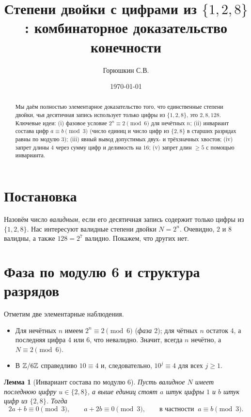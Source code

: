 \documentclass[12pt]{article}
\title{Степени двойки с цифрами из $\{1,2,8\}$: комбинаторное доказательство конечности}
\author{Горюшкин С.В.}
\date{\today}
\theoremstyle{plain}
\newtheorem{lemma}{Лемма}
\theoremstyle{remark}
\begin{document}
\maketitle

\begin{abstract}
Мы даём полностью элементарное доказательство того, что единственные степени двойки, чья десятичная запись использует только цифры из $\{1,2,8\}$, это $2,8,128$. Ключевые идеи: (i) фазовое условие $2^n\equiv2\pmod6$ для нечётных $n$; (ii) инвариант состава цифр $a\equiv b\pmod3$ (число единиц и число цифр из $\{2,8\}$ в старших разрядах равны по модулю $3$); (iii) явный вывод допустимых двух- и трёхзначных хвостов; (iv) запрет длины $4$ через сумму цифр и делимость на $16$; (v) запрет длин $\ge5$ с помощью инварианта.
\end{abstract}

\section{Постановка}
Назовём число \emph{валидным}, если его десятичная запись содержит только цифры из $\{1,2,8\}$. Нас интересуют валидные степени двойки $N=2^n$. Очевидно, $2$ и $8$ валидны, а также $128=2^7$ валидно. Покажем, что других нет.

\section{Фаза по модулю 6 и структура разрядов}
Отметим две элементарные наблюдения.
\begin{itemize}[nosep]
\item Для нечётных $n$ имеем $2^n\equiv 2\pmod6$ (\emph{фаза $2$}); для чётных $n$ остаток $4$, а последняя цифра $4$ или $6$, что невалидно. Значит, всегда $n$ нечётно, а $N\equiv2\pmod6$.
\item В $\Bbb Z/6\Bbb Z$ справедливо $10\equiv4$ и, следовательно, $10^j\equiv4$ для всех $j\ge1$.
\end{itemize}

\begin{lemma}[Инвариант состава по модулю 6]\label{lem:inv}
Пусть валидное $N$ имеет последнюю цифру $u\in\{2,8\}$, а выше единиц стоят $a$ штук цифры $1$ и $b$ штук цифр из $\{2,8\}$. Тогда
\begin{equation}\label{eq:ab}
2a+b\equiv0\pmod3,\qquad a+2b\equiv0\pmod3,\qquad\text{в частности }~ a\equiv b\pmod3.
\end{equation}
\end{lemma}
\end{document}
